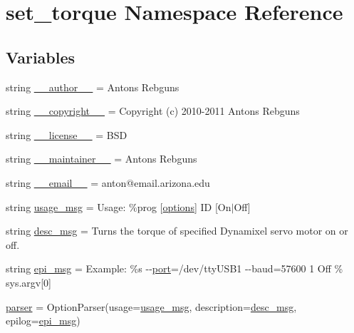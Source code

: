 \hypertarget{namespaceset__torque}{}\section{set\+\_\+torque Namespace Reference}
\label{namespaceset__torque}
\subsection*{Variables}
\begin{DoxyCompactItemize}
\item 
string \hyperlink{namespaceset__torque_a2e69378535d5b94d4df3a687ae509adb}{\+\_\+\+\_\+author\+\_\+\+\_\+} = \textquotesingle{}Antons Rebguns\textquotesingle{}
\item 
string \hyperlink{namespaceset__torque_acf9b8a457311efa2047da3cf591d8008}{\+\_\+\+\_\+copyright\+\_\+\+\_\+} = \textquotesingle{}Copyright (c) 2010-\/2011 Antons Rebguns\textquotesingle{}
\item 
string \hyperlink{namespaceset__torque_ad33c36f3069aa0552087badcf9ea7e6b}{\+\_\+\+\_\+license\+\_\+\+\_\+} = \textquotesingle{}B\+SD\textquotesingle{}
\item 
string \hyperlink{namespaceset__torque_a9fdc365e9614b1add35ee64ca3faf9b8}{\+\_\+\+\_\+maintainer\+\_\+\+\_\+} = \textquotesingle{}Antons Rebguns\textquotesingle{}
\item 
string \hyperlink{namespaceset__torque_a3ecbbad958e9b57624fd08d8ee68c461}{\+\_\+\+\_\+email\+\_\+\+\_\+} = \textquotesingle{}anton@email.\+arizona.\+edu\textquotesingle{}
\item 
string \hyperlink{namespaceset__torque_ac57a865b31cdc6e55fd5593f50488de6}{usage\+\_\+msg} = \textquotesingle{}Usage\+: \%prog \mbox{[}\hyperlink{namespaceset__torque_a0b961e29ab6d708b77dab37ac082ee90}{options}\mbox{]} ID \mbox{[}On$\vert$Off\mbox{]}\textquotesingle{}
\item 
string \hyperlink{namespaceset__torque_a6715e5416a3468b017ad49067131cf3f}{desc\+\_\+msg} = \textquotesingle{}Turns the torque of specified Dynamixel servo motor on or off.\textquotesingle{}
\item 
string \hyperlink{namespaceset__torque_a34aa95210a205aecf7fe7bef0517fbd9}{epi\+\_\+msg} = \textquotesingle{}Example\+: \%s -\/-\/\hyperlink{namespaceset__torque_adbb76185d3bc8d9acc1d2d233efb3ef9}{port}=/dev/tty\+U\+S\+B1 -\/-\/baud=57600 1 Off\textquotesingle{} \% sys.\+argv\mbox{[}0\mbox{]}
\item 
\hyperlink{namespaceset__torque_a26f3ea70fdc5c5e10ff222e71ecbdcc7}{parser} = Option\+Parser(usage=\hyperlink{namespaceset__torque_ac57a865b31cdc6e55fd5593f50488de6}{usage\+\_\+msg}, description=\hyperlink{namespaceset__torque_a6715e5416a3468b017ad49067131cf3f}{desc\+\_\+msg}, epilog=\hyperlink{namespaceset__torque_a34aa95210a205aecf7fe7bef0517fbd9}{epi\+\_\+msg})

\end{DoxyCompactItemize}

